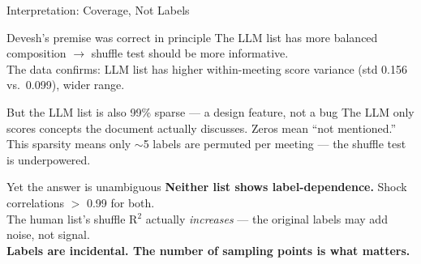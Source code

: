 \documentclass[10pt,aspectratio=169]{beamer}
\begin{document}
\begin{frame}{Interpretation: Coverage, Not Labels}
  \vspace{2pt}
  \begin{block}{Devesh's premise was correct in principle}
    \centering\footnotesize
    The LLM list has more balanced composition $\to$ shuffle test should be more informative.\\[1pt]
    The data confirms: LLM list has higher within-meeting score variance (std 0.156 vs.\ 0.099), wider range.
  \end{block}
  \vspace{4pt}
  \begin{block}{But the LLM list is also 99\% sparse --- a design feature, not a bug}
    \centering\footnotesize
    The LLM only scores concepts the document actually discusses. Zeros mean ``not mentioned.''\\[1pt]
    This sparsity means only $\sim$5 labels are permuted per meeting --- the shuffle test is underpowered.
  \end{block}
  \vspace{4pt}
  \begin{block}{Yet the answer is unambiguous}
    \centering\footnotesize
    \textbf{Neither list shows label-dependence.} Shock correlations $>$ 0.99 for both.\\[1pt]
    The human list's shuffle R$^2$ actually \textit{increases} --- the original labels may add noise, not signal.\\[1pt]
    \textbf{Labels are incidental. The number of sampling points is what matters.}
  \end{block}
\end{frame}

\end{document}
